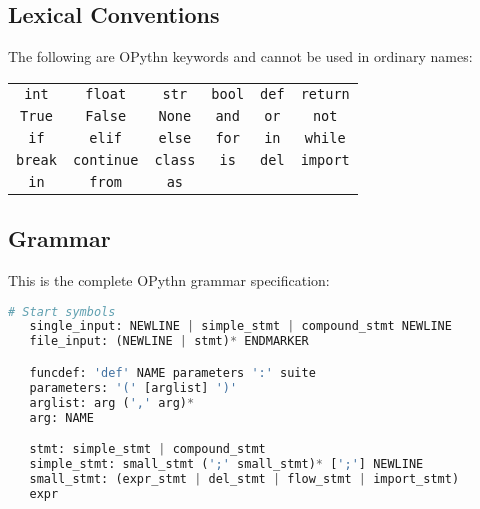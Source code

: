 \documentclass[11pt, A4, twoside]{article}
\newcommand{\ms}{\texttt}
\begin{document}
    \subsection{Lexical Conventions}
    The following are OPythn keywords and cannot be used in ordinary names:
    \begin{center}
        \begin{tabular}{cccccc}
            \ms{int} & \ms{float} & \ms{str} & \ms{bool} & \ms{def} & \ms{return}\\
            \ms{True} & \ms{False} & \ms{None} & \ms{and} & \ms{or} & \ms{not}\\
            \ms{if} & \ms{elif} & \ms{else} & \ms{for} & \ms{in} & \ms{while}\\
            \ms{break} & \ms{continue} & \ms{class} & \ms{is} & \ms{del} & \ms{import}\\
            \ms{in} & \ms{from} & \ms{as} &&&
    \end{tabular}
    \end{center}

   \subsection{Grammar}
   This is the complete OPythn grammar specification:
   \begin{lstlisting}[language=python]
   # Start symbols
   single_input: NEWLINE | simple_stmt | compound_stmt NEWLINE
   file_input: (NEWLINE | stmt)* ENDMARKER

   funcdef: 'def' NAME parameters ':' suite
   parameters: '(' [arglist] ')'
   arglist: arg (',' arg)*
   arg: NAME

   stmt: simple_stmt | compound_stmt
   simple_stmt: small_stmt (';' small_stmt)* [';'] NEWLINE
   small_stmt: (expr_stmt | del_stmt | flow_stmt | import_stmt)
   expr
   \end{lstlisting}
\end{document}
